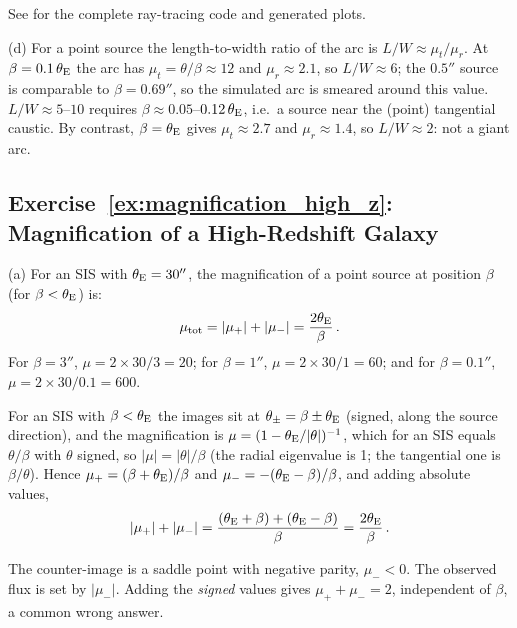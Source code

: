 See 
for the complete ray-tracing code and generated plots.

(d) For a point source the length-to-width ratio of the arc is
$L/W \approx \mu_t/\mu_r$.  At $\beta = 0.1\,\theta_{\mathrm{E}}$ the arc has
$\mu_t = \theta/\beta \approx 12$ and $\mu_r \approx 2.1$, so
$L/W \approx 6$; the $0.5''$ source is comparable to $\beta = 0.69''$, so
the simulated arc is smeared around this value.  $L/W \approx 5$--$10$
requires $\beta \approx 0.05$--$0.12\,\theta_{\mathrm{E}}$, i.e.\ a source near the
(point) tangential caustic.  By contrast, $\beta = \theta_{\mathrm{E}}$ gives
$\mu_t \approx 2.7$ and $\mu_r \approx 1.4$, so $L/W \approx 2$: not a giant
arc.  \checkmark


\subsection*{Exercise~\ref{ex:magnification_high_z}: Magnification of a High-Redshift Galaxy}

(a) For an SIS with $\theta_{\mathrm{E}} = 30''$, the magnification of a
point source at position $\beta$ (for $\beta < \theta_{\mathrm{E}}$) is:
\begin{equation*}
    \mu_{\mathrm{tot}} = |\mu_+| + |\mu_-|
    = \frac{2\theta_{\mathrm{E}}}{\beta} \,.
\end{equation*}
For $\beta = 3''$, $\mu = 2 \times 30/3 = 20$; for $\beta = 1''$,
$\mu = 2 \times 30/1 = 60$; and for $\beta = 0.1''$,
$\mu = 2 \times 30/0.1 = 600$.

\begin{derivation}
For an SIS with $\beta < \theta_{\mathrm{E}}$ the images sit at
$\theta_\pm = \beta \pm \theta_{\mathrm{E}}$ (signed, along the source direction), and
the magnification is $\mu = (1 - \theta_{\mathrm{E}}/|\theta|)^{-1}$, which for an SIS
equals $\theta/\beta$ with $\theta$ signed, so $|\mu| = |\theta|/\beta$ (the
radial eigenvalue is 1; the tangential one is $\beta/\theta$).  Hence
$\mu_+ = (\beta+\theta_{\mathrm{E}})/\beta$ and $\mu_- = -(\theta_{\mathrm{E}}-\beta)/\beta$, and
adding absolute values,
\begin{equation*}
    |\mu_+| + |\mu_-| = \frac{(\theta_{\mathrm{E}}+\beta) + (\theta_{\mathrm{E}}-\beta)}{\beta}
    = \frac{2\theta_{\mathrm{E}}}{\beta}\,.
\end{equation*}
\end{derivation}

\begin{annotation}
The counter-image is a saddle point with negative parity, $\mu_- < 0$.
The observed flux is set by $|\mu_-|$.  Adding the \emph{signed} values
gives $\mu_+ + \mu_- = 2$, independent of $\beta$, a common wrong answer.
\end{annotation}

